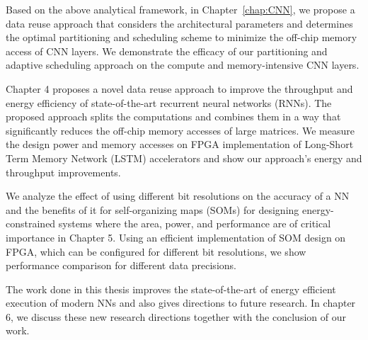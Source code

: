 Based on the above analytical framework, in Chapter~\ref{chap:CNN}, we propose a data reuse approach that considers the architectural parameters and determines the optimal partitioning and scheduling scheme to minimize the off-chip memory access of CNN layers. We demonstrate the efficacy of our partitioning and adaptive scheduling approach on the compute and memory-intensive CNN layers. 

Chapter 4 proposes a novel data reuse approach to improve the throughput and energy efficiency of state-of-the-art recurrent neural networks (RNNs). The proposed approach splits the computations and combines them in a way that significantly reduces the off-chip memory accesses of large matrices. We measure the design power and memory accesses on FPGA implementation of Long-Short Term Memory Network (LSTM) accelerators and show our approach's energy and throughput improvements.

We analyze the effect of using different bit resolutions on the accuracy of a NN and the benefits of it for self-organizing maps (SOMs) for designing energy-constrained systems where the area, power, and performance are of critical importance in Chapter 5. Using an efficient implementation of SOM design on FPGA, which can be configured for different bit resolutions, we show performance comparison for different data precisions. 

The work done in this thesis improves the state-of-the-art of energy efficient execution of modern NNs and also gives directions to future research. In chapter 6, we discuss these new research directions together with the conclusion of our work.